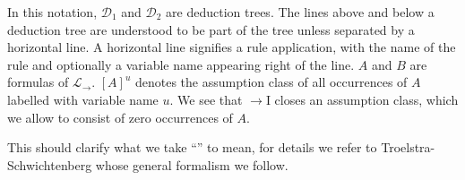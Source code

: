 In this notation, $\mathcal{D}_1$ and $\mathcal{D}_2$ are deduction trees. The
lines above and below a deduction tree are understood to be part of the tree
unless separated by a horizontal line. A horizontal line signifies a rule
application, with the name of the rule and optionally a variable name appearing
right of the line. $A$ and $B$ are formulas of $\mathcal{L}_\to$. $[A]^u$
denotes the assumption class of all occurrences of $A$ labelled with variable
name $u$. We see that $\to$I closes an assumption class, which we allow to
consist of zero occurrences of $A$.

This should clarify what we take ``\implnpi'' to mean, for details we refer to
Troelstra-Schwichtenberg whose general formalism we follow.
